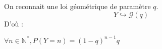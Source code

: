 On reconnait une loi géométrique de paramètre $q$.
\[
  Y\hookrightarrow\mathcal{G}(q)
\]
D'où :
\begin{result}
  $\forall n\in\mathbb{N}^*, P(Y=n)=(1-q)^{n-1}q$
\end{result}
